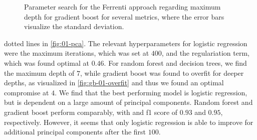 \begin{table}[!ht]
\centering
\caption{A table of the optimal number of principal components and the respective scores (standard deviation) for the ferrenti approach, as visualized in the dash-dotted line in \autoref{fig:01-pca}.}
\label{tab:01-pc}
\noindent{}
\end{table}



\begin{wrapfigure}{R}{0.5\textwidth}

  \begin{subfigure}[b]{1.0\textwidth}
  
  \end{subfigure}

  \begin{subfigure}[b]{1.0\textwidth}
  
  \end{subfigure}
  \vspace*{-130mm}
  \caption{Parameter search for the Ferrenti approach regarding maximum depth for gradient boost for several metrics, where the error bars visualize the standard deviation.}
  \label{fig:gb-01-overfit}
\end{wrapfigure}


\noindent dotted lines in \autoref{fig:01-pca}. The relevant hyperparameters for logistic regression were the maximum iterations, which was set at $400$, and the regulariation term, which was found optimal at $0.46$. For random forest and decision trees, we find the maximum depth of $7$, while gradient boost was found to overfit for deeper depths, as visualized in \autoref{fig:gb-01-overfit} and thus we found an optimal compromise at $4$. We find that the best performing model is logistic regression, but is dependent on a large amount of principal components. Random forest and gradient boost perform comparably, with and f1 score of $0.93$ and $0.95$, respectively. However, it seems that only logistic regression is able to improve for additional principal components after the first $100$.



